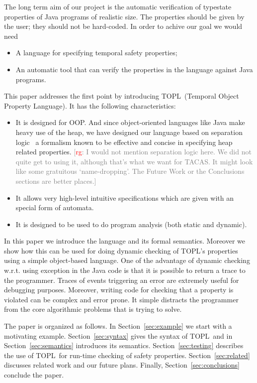 \documentclass[preprint]{sigplanconf} %
\newcommand{\note}[2]{\textcolor{gray}{[\textcolor{red}{#1}: #2]}}
\newcommand{\rg}[1]{\note{rg}{#1}}
\newcommand{\TPL}{TOPL}
\theoremstyle{definition}
\begin{document}
The long term aim of our project is the automatic verification of typestate properties of Java programs of realistic size.  
The properties should be given by the user; they should not be hard-coded.
In order to achive our goal we would need
\begin{itemize}
\item A language for specifying temporal safety properties;
\item An automatic tool that can verify the properties in the language
  against Java programs.
\end{itemize}
This paper addresses the first point by introducing \TPL  \ (Temporal Object Property Language). 
It has the following characteristics:
\begin{itemize}
\item It is designed for OOP. 
And since object-oriented languages like Java make heavy use of the heap, we have designed our language based on separation logic~\cite{reynolds2002} a formalism known to be effective and concise in specifying heap related properties.
\rg{I would not mention separation logic here.
We did not quite get to using it, although that's what we want for TACAS\null.
It might look like some gratuitous `name-dropping'.
The Future Work or the Conclusions sections are better places.}
\item It allows very high-level intuitive specifications which are given with an special form of automata.
\item It is designed to be used to do program analysis (both static and dynamic).
\end{itemize}  
In this paper we introduce the language and its formal semantics. 
Moreover we show how this can be used for doing dynamic checking of \TPL's properties using a simple object-based language. One of the advantage of dynamic checking w.r.t. using exception in the Java code is that it is possible to
return a trace to the programmer. Traces of events triggering an error are extremely useful for debugging purposes.
Moreover, writing code for checking that a property is violated can be complex and error prone. It simple distracts the programmer from the core algorithmic problems that is trying to solve.





The paper is organized as follows. In Section~\ref{sec:example} we start with a motivating example. 
Section~\ref{sec:syntax} gives the syntax of \TPL \ and in Section~\ref{sec:semantics} introduces its semantics. 
Section~\ref{sec:testing} describes the use of \TPL \ for run-time checking of safety properties. 
Section~\ref{sec:related} discusses related work and our future plans. 
Finally, Section~\ref{sec:conclusions} conclude the paper.
\end{document}
